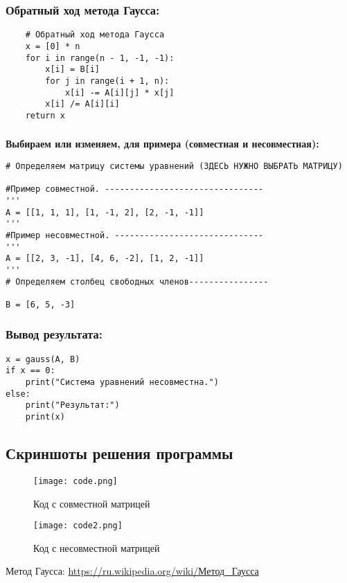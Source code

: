 \documentclass[12pt,a4paper]{scrartcl}
\begin{document}
\subsubsection{\textbf{Обратный ход метода Гаусса:}}
\begin{verbatim}
    # Обратный ход метода Гаусса
    x = [0] * n
    for i in range(n - 1, -1, -1):
        x[i] = B[i]
        for j in range(i + 1, n):
            x[i] -= A[i][j] * x[j]
        x[i] /= A[i][i]
    return x
\end{verbatim}
\subsubsection{}
\textbf{Выбираем или изменяем, для примера (совместная и несовместная):}
\begin{verbatim}
# Определяем матрицу системы уравнений (ЗДЕСЬ НУЖНО ВЫБРАТЬ МАТРИЦУ)

#Пример совместной. --------------------------------
'''
A = [[1, 1, 1], [1, -1, 2], [2, -1, -1]]
'''
#Пример несовместной. ------------------------------
'''
A = [[2, 3, -1], [4, 6, -2], [1, 2, -1]]
'''
# Определяем столбец свободных членов----------------

B = [6, 5, -3]
\end{verbatim}
\subsubsection{\textbf{Вывод результата:}}
\begin{verbatim}
x = gauss(A, B)
if x == 0:
    print("Система уравнений несовместна.")
else:
    print("Результат:")
    print(x)
\end{verbatim}

\newpage

\subsection{Скриншоты решения программы}
\label{sec:picexample}
\begin{figure}[h]
	\centering
	\texttt{[image: code.png]}
	\caption{Код с совместной матрицей}\label{fig:par}
\end{figure}
\label{sec:picexample}
\begin{figure}[h]
	\centering
	\texttt{[image: code2.png]}
	\caption{Код с несовместной матрицей}\label{fig:par}
\end{figure}
\newpage
\begin{thebibliography}{9}
 Метод Гаусса: \href{https://ru.wikipedia.org/wiki/Метод_Гаусса}{https://ru.wikipedia.org/wiki/Метод\_Гаусса}

\end{thebibliography}
\end{document}

